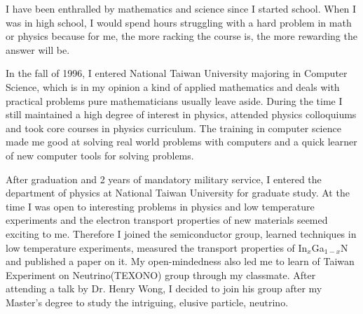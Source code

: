 \documentclass[10pt]{article}
\begin{document}
I have been enthralled by mathematics and science since I started school. When I was in high school, I would spend hours struggling with a hard problem in math or physics because for me, the more racking the course is, the more rewarding the answer will be.


In the fall of 1996, I entered National Taiwan University majoring in Computer Science, which is in my opinion a kind of applied mathematics and deals with practical problems pure mathematicians usually leave aside. During the time I still maintained a high degree of interest in physics, attended physics colloquiums and took core courses in physics curriculum. The training in computer science made me good at solving real world problems with computers and a quick learner of new computer tools for solving problems.


After graduation and 2 years of mandatory military service, I entered the department of physics at National Taiwan University for graduate study. At the time I was open to interesting problems in physics and low temperature experiments and the electron transport properties of new materials seemed exciting to me. Therefore I joined the semiconductor group, learned techniques in low temperature experiments, measured the transport properties of In$_x$Ga$_{1-x}$N and published a paper on it. My open-mindedness also led me to learn of Taiwan Experiment on Neutrino(TEXONO) group through my classmate. After attending a talk by Dr. Henry Wong, I decided to join his group after my Master's degree to study the intriguing, elusive particle, neutrino.
\end{document}
